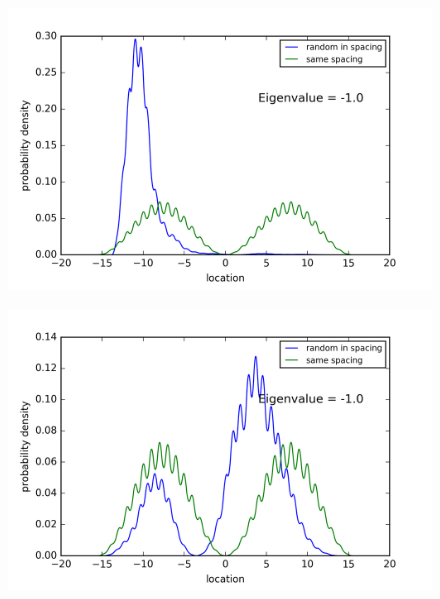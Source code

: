 \begin{figure}[!htbh]
\centering
\begin{minipage}{.45\textwidth}
  \centering
  \includegraphics[width=1.1\linewidth]{Graphics/1_0_2th_Lowest_Rand0_8.png}
  \label{fig:Area1_2thlowestRand0.8}
\end{minipage}\qquad
\begin{minipage}{.45\textwidth}
  \centering
  \includegraphics[width=1.1\linewidth]{Graphics/1_0_2th_Lowest_Rand0_9.png}
  \label{fig:Area1_2thlowestRand0.9}
\end{minipage}
\end{figure}

